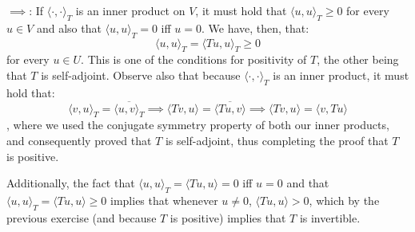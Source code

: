 \begin{solution}

    $\implies$: If $\langle \cdot, \cdot \rangle_{T}$ is an inner product on $V$, it must hold that $\langle u, u \rangle_{T} \geq 0$ for every $u \in V$ and also that $\langle u, u \rangle_{T} = 0$ iff $u = 0$. We have, then, that:
    $$\langle u, u \rangle_{T} = \langle Tu, u \rangle_{T} \geq 0$$
    for every $u \in U$. This is one of the conditions for positivity of $T$, the other being that $T$ is self-adjoint. Observe also that because $\langle \cdot, \cdot \rangle_{T}$ is an inner product, it must hold that:
    $$\langle v, u \rangle_{T} = \overline{\langle u, v \rangle_{T}} \implies \langle Tv, u \rangle = \overline{\langle Tu, v \rangle} \implies \langle Tv, u \rangle = \langle v, Tu \rangle$$
    , where we used the conjugate symmetry property of both our inner products, and consequently proved that $T$ is self-adjoint, thus completing the proof that $T$ is positive.

    Additionally, the fact that $\langle u, u \rangle_{T} = \langle Tu, u \rangle = 0$ iff $u = 0$ and that $\langle u, u \rangle_{T} = \langle Tu, u \rangle \geq 0$ implies that whenever $u \neq 0$, $\langle Tu, u \rangle > 0$, which by the previous exercise (and because $T$ is positive) implies that $T$ is invertible.


\end{solution}
